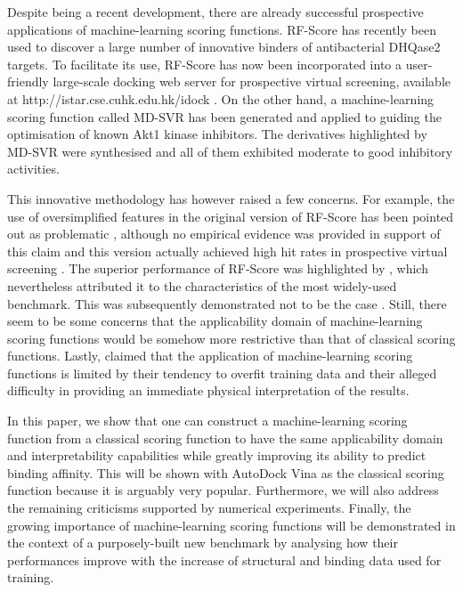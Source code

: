 Despite being a recent development, there are already successful prospective applications of machine-learning scoring functions. RF-Score \citep{564} has recently been used \citep{1281} to discover a large number of innovative binders of antibacterial DHQase2 targets. To facilitate its use, RF-Score  has now been incorporated into a user-friendly large-scale docking web server for prospective virtual screening, available at http://istar.cse.cuhk.edu.hk/idock \citep{1362}. On the other hand, a machine-learning scoring function called MD-SVR has been generated and applied \citep{1452} to guiding the optimisation of known Akt1 kinase inhibitors. The derivatives highlighted by MD-SVR were synthesised and all of them exhibited moderate to good inhibitory activities.

This innovative methodology has however raised a few concerns. For example, the use of oversimplified features in the original version of RF-Score has been pointed out as problematic \citep{1453}, although no empirical evidence was provided in support of this claim and this version actually achieved high hit rates in prospective virtual screening \citep{1281}. The superior performance of RF-Score was highlighted by \citep{774}, which nevertheless attributed it to the characteristics of the most widely-used benchmark. This was subsequently demonstrated not to be the case \citep{908}. Still, there seem to be some concerns that the applicability domain of machine-learning scoring functions would be somehow more restrictive than that of classical scoring functions. Lastly, \citep{1372} claimed that the application of machine-learning scoring functions is limited by their tendency to overfit training data and their alleged difficulty in providing an immediate physical interpretation of the results.

In this paper, we show that one can construct a machine-learning scoring function from a classical scoring function to have the same applicability domain and interpretability capabilities while greatly improving its ability to predict binding affinity. This will be shown with AutoDock Vina \citep{595} as the classical scoring function because it is arguably very popular. Furthermore, we will also address the remaining criticisms supported by numerical experiments. Finally, the growing importance of machine-learning scoring functions will be demonstrated in the context of a purposely-built new benchmark by analysing how their performances improve with the increase of structural and binding data used for training.

